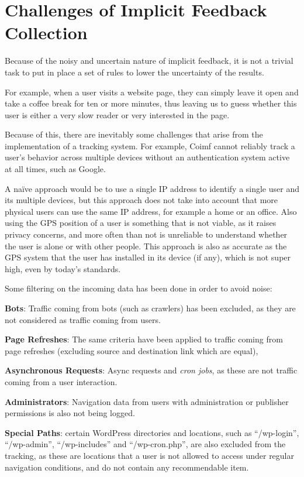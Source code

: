\documentclass[sigconf,nonacm]{acmart}
\begin{document}
\section{Challenges of Implicit Feedback Collection}
\label{sec:challenges}

Because of the noisy and uncertain nature of implicit feedback, it is not a
trivial task to put in place a set of rules to lower the uncertainty of the results.

For example, when a user visits a website page, they can simply leave it open and take a
coffee break for ten or more minutes, thus leaving us to guess whether this user
is either a very slow reader or very interested in the page.

Because of this, there are inevitably some challenges that arise from the
implementation of a tracking system.
For example, Coimf cannot reliably track a user's behavior across multiple
devices without an authentication system active at all times, such as Google.

A naïve approach would be to use a single IP address to identify a single
user and its multiple devices, but this approach does not take into account that
more physical users can use the same IP address, for example a home or an office.
Also using the GPS position of a user is something that is not viable, as it raises
privacy concerns, and more often than not is unreliable to understand whether
the user is alone or with other people. This approach is also as accurate as the GPS
system that the user has installed in its device (if any), which is not super high,
even by today's standards.

Some filtering on the incoming data has been done in order to avoid noise:

\textbf{Bots}: Traffic coming from bots (such as crawlers) has been excluded, as they are not
considered as traffic coming from users.

\textbf{Page Refreshes}: The same criteria have been applied to traffic
coming from page refreshes (excluding source and destination link which are equal),

\textbf{Asynchronous Requests}: Async requests and \textit{cron jobs}, as these
are not traffic coming from a user interaction.

\textbf{Administrators}: Navigation data from users with administration or publisher
permissions is also not being logged.

\textbf{Special Paths}: certain WordPress directories and locations, such as
``/wp-login'', ``/wp-admin'', ``/wp-includes'' and ``/wp-cron.php'', are also
excluded from the tracking, as these are locations that a user is not allowed to
access under regular navigation conditions, and do not contain any recommendable
item.
\end{document}

